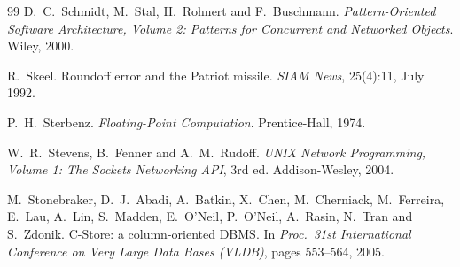 \begin{thebibliography}{99}
 D.~C.~Schmidt, M.~Stal, H.~Rohnert and F.~Buschmann. \emph{Pattern-Oriented Software Architecture, Volume 2: Patterns for Concurrent and Networked Objects}. Wiley, 2000.

 R.~Skeel. Roundoff error and the Patriot missile. \emph{SIAM News}, 25(4):11, July 1992.

 P.~H.~Sterbenz. \emph{Floating-Point Computation}. Prentice-Hall, 1974.

 W.~R.~Stevens, B.~Fenner and A.~M.~Rudoff. \emph{UNIX Network Programming, Volume 1: The Sockets Networking API}, 3rd ed. Addison-Wesley, 2004.

 M.~Stonebraker, D.~J.~Abadi, A.~Batkin, X.~Chen, M.~Cherniack, M.~Ferreira, E.~Lau, A.~Lin, S.~Madden, E.~O'Neil, P.~O'Neil, A.~Rasin, N.~Tran and S.~Zdonik. C-Store: a column-oriented DBMS. In \emph{Proc.\ 31st International Conference on Very Large Data Bases (VLDB)}, pages 553--564, 2005.

\end{thebibliography}
\endgroup
